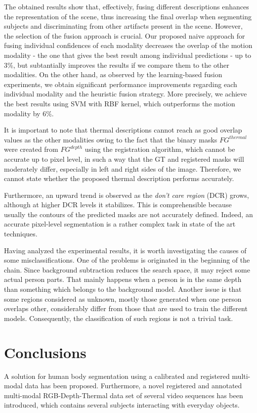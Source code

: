 \documentclass[10pt,twocolumn,letterpaper]{article}
\begin{document}
The obtained results show that, effectively, fusing different descriptions enhances the representation of the scene, thus increasing the final overlap when segmenting subjects and discriminating from other artifacts present in the scene. However, the selection of the fusion approach is crucial. Our proposed naive approach for fusing individual confidences of each modality decreases the overlap of the motion modality - the one that gives the best result among individual predictions -  up to 3\%, but subtantially improves the results if we compare them to the other modalities. On the other hand, as observed by the learning-based fusion experiments, we obtain significant performance improvements regarding each individual modality and the heuristic fusion strategy. More precisely, we achieve the best results using SVM with RBF kernel, which outperforms the motion modality by 6\%.

It is important to note that thermal descriptions cannot reach as good overlap values as the other modalities owing to the fact that the binary masks $FG^{thermal}$ were created from $FG^{depth}$ using the registration algorithm, which cannot be accurate up to pixel level, in such a way that the GT and registered masks will moderately differ, especially in left and right sides of the image. Therefore, we cannot state whether the proposed thermal description performs accurately.

Furthermore, an upward trend is observed as the \emph{don't care region} (DCR) grows, although at higher DCR levels it stabilizes. This is comprehensible because usually the contours of the predicted masks are not accurately defined. Indeed, an accurate pixel-level segmentation is a rather complex task in state of the art techniques.

Having analyzed the experimental results, it is worth investigating the causes of some
misclassifications. One of the problems is originated in the beginning of the chain. Since
background subtraction reduces the search space, it may reject some actual person parts.
That mainly happens when a person is in the same depth than something which belongs
to the background model. Another issue is that some regions considered as unknown,
mostly those generated when one person overlaps other, considerably differ from those
that are used to train the different models. Consequently, the classification of such regions
is not a trivial task.

\section{Conclusions}
\label{sec:conclusions}
A solution for human body segmentation using a calibrated and registered multi-modal data has been proposed. Furthermore, a novel registered and annotated multi-modal RGB-Depth-Thermal data set of several video sequences has been introduced, which contains several
subjects interacting with everyday objects.
\end{document}
